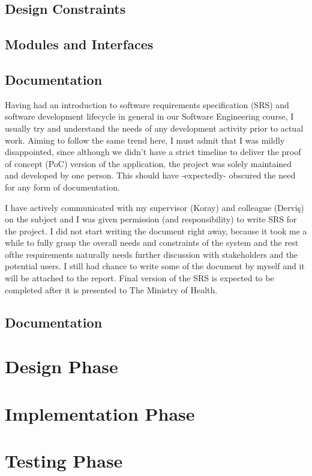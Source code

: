 \subsection{Design Constraints}
\subsection{Modules and Interfaces}
\subsection{Documentation}

Having had an introduction to software requirements specification (SRS) and 
software development lifecycle in general in our Software Engineering course, 
I usually try and understand the needs of any development activity prior to 
actual work. Aiming to follow the same trend here, I must admit that I was 
mildly disappointed, since although we didn't have a strict timeline to 
deliver the proof of concept (PoC) version of the application, the project 
was solely maintained and developed by one person. This should have 
-expectedly- obscured the need for any form of documentation.
\par I have actively communicated with my supervisor (Koray) and colleague 
(Derviş) on the subject and I was given permission (and responsibility) to 
write SRS for the project. I did not start writing the document right away, 
because it took me a while to fully grasp the overall needs and constraints 
of the system and the rest ofthe requirements naturally needs further 
discussion with stakeholders and the potential users. I still had chance to 
write some of the document by myself and it will be attached to the report. 
Final version of the SRS is expected to be completed after it is presented 
to The Ministry of Health.

\subsection{Documentation}

\section{Design Phase}
\section{Implementation Phase}
\section{Testing Phase}